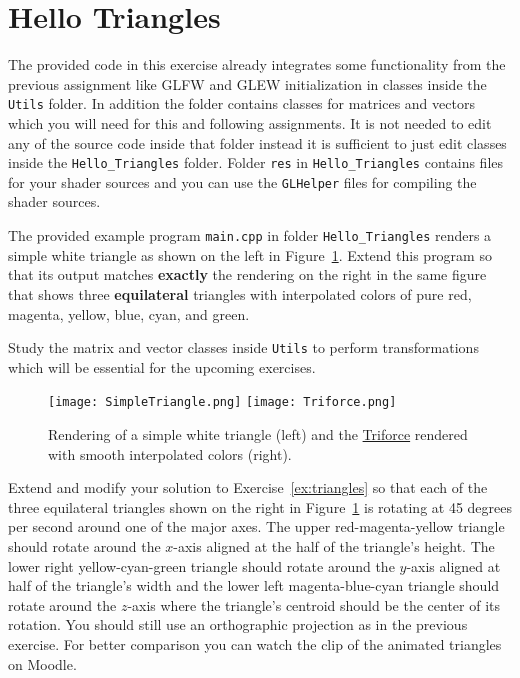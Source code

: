 \documentclass[12pt, a4paper, oneside, ngerman]{article}
\begin{document}


\section{Hello Triangles}
The provided code in this exercise already integrates some functionality from the previous assignment like GLFW and GLEW initialization in classes inside the \texttt{Utils} folder. In addition the folder contains classes for matrices and vectors which you will need for this and following assignments. It is not needed to edit any of the source code inside that folder instead it is sufficient to just edit classes inside the \texttt{Hello\_Triangles} folder. Folder \texttt{res} in \texttt{Hello\_Triangles} contains files for your shader sources and you can use the \texttt{GLHelper} files for compiling the shader sources.

\label{ex:triangles}

The provided example program \texttt{main.cpp} in folder \texttt{Hello\_Triangles} renders a simple white triangle as shown on the left in Figure~\ref{fig:triangles}. Extend this program so that its output matches \textbf{exactly} the rendering on the right in the same figure that shows three \textbf{equilateral} triangles with interpolated colors of pure red, magenta, yellow, blue, cyan, and green.

Study the matrix and vector classes inside \texttt{Utils} to perform transformations which will be essential for the upcoming exercises.

\begin{figure}
  \centering
  \texttt{[image: SimpleTriangle.png]}
  \texttt{[image: Triforce.png]}
  \caption{Rendering of a simple white triangle (left) and the \href{http://en.wikipedia.org/wiki/Triforce}{Triforce} rendered with smooth interpolated colors (right).}
  \label{fig:triangles}
\end{figure}




\label{ex:animations}

Extend and modify your solution to Exercise~\ref{ex:triangles} so that each of the three equilateral triangles shown on the right in Figure~\ref{fig:triangles} is rotating at 45 degrees per second around one of the major axes. The upper red-magenta-yellow triangle should rotate around the $x$-axis aligned at the half of the triangle's height. The lower right yellow-cyan-green triangle should rotate around the $y$-axis aligned at half of the triangle's width and the lower left magenta-blue-cyan triangle should rotate around the $z$-axis where the triangle's centroid should be the center of its rotation. You should still use an orthographic projection as in the previous exercise. For better comparison you can watch the clip of the animated triangles on Moodle.
\end{document}
